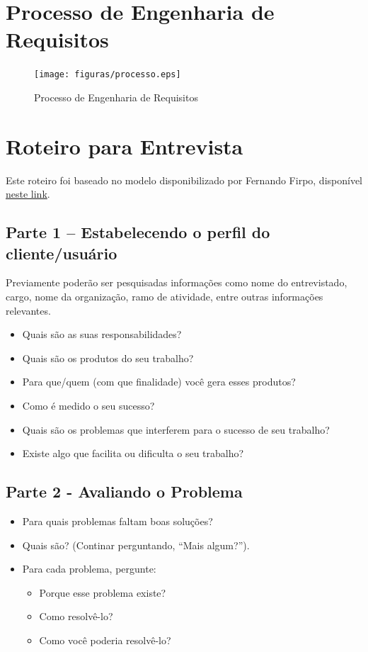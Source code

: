 \begin{anexosenv}

\partanexos

\chapter{Processo de Engenharia de Requisitos}
\label{annex:processo}

\begin{figure}[!h]
        \centering
        \texttt{[image: figuras/processo.eps]}
        \caption{Processo de Engenharia de Requisitos}
\end{figure}


\chapter{Roteiro para Entrevista}
\label{annex:roteiro}

Este roteiro foi baseado no modelo disponibilizado por Fernando Firpo, disponível \href{http://analiserequisitos.blogspot.com.br/2011/07/processos-de-obtencao-de-requisitos.html}{neste link}.

\section{Parte 1 – Estabelecendo o perfil do cliente/usuário}
Previamente poderão ser pesquisadas informações como nome do entrevistado, cargo, nome da organização, ramo de atividade, entre outras informações relevantes.

\begin{itemize}
  \item Quais são as suas responsabilidades?
  \item Quais são os produtos do seu trabalho?
  \item Para que/quem (com que finalidade) você gera esses produtos?
  \item Como é medido o seu sucesso?
  \item Quais são os problemas que interferem para o sucesso de seu trabalho?
  \item Existe algo que facilita ou dificulta o seu trabalho?
\end{itemize}

\section{Parte 2 - Avaliando o Problema}
\begin{itemize}
  \item Para quais problemas faltam boas soluções?
  \item Quais são? (Continar perguntando, “Mais algum?”).
  \item Para cada problema, pergunte:
    \begin{itemize}
      \item Porque esse problema existe?
      \item Como resolvê-lo?
      \item Como você poderia resolvê-lo?
    \end{itemize}
\end{itemize}


\end{anexosenv}

